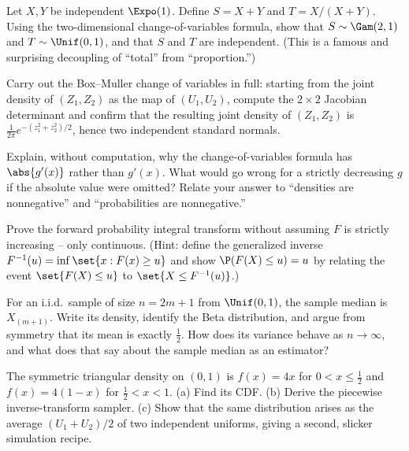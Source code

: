 \begin{exercise}
\label{ch16:ex-jacobian2}
Let $X, Y$ be independent $\Expo(1)$. Define $S = X + Y$ and $T = X/(X+Y)$. Using the
two-dimensional change-of-variables formula, show that $S \sim \Gam(2,1)$ and
$T \sim \Unif(0,1)$, and that $S$ and $T$ are independent. (This is a famous and surprising
decoupling of ``total'' from ``proportion.'')
\end{exercise}

\begin{exercise}
\label{ch16:ex-bm}
Carry out the Box--Muller change of variables in full: starting from the joint density of
$(Z_1, Z_2)$ as the map of $(U_1, U_2)$, compute the $2\times2$ Jacobian determinant and
confirm that the resulting joint density of $(Z_1,Z_2)$ is
$\tfrac{1}{2\pi}e^{-(z_1^2+z_2^2)/2}$, hence two independent standard normals.
\end{exercise}

\begin{exercise}
\label{ch16:ex-absval}
Explain, without computation, why the change-of-variables formula has $\abs{g'(x)}$ rather
than $g'(x)$. What would go wrong for a strictly decreasing $g$ if the absolute value were
omitted? Relate your answer to ``densities are nonnegative'' and ``probabilities are
nonnegative.''
\end{exercise}

\begin{exercise}
\label{ch16:ex-pit-proof}
Prove the forward probability integral transform without assuming $F$ is strictly
increasing -- only continuous. (Hint: define the generalized inverse
$F^{-1}(u) = \inf\set{x : F(x)\ge u}$ and show $\P(F(X)\le u) = u$ by relating the event
$\set{F(X)\le u}$ to $\set{X \le F^{-1}(u)}$.)
\end{exercise}

\begin{exercise}
\label{ch16:ex-median}
For an i.i.d.\ sample of size $n = 2m+1$ from $\Unif(0,1)$, the sample median is
$X_{(m+1)}$. Write its density, identify the Beta distribution, and argue from symmetry
that its mean is exactly $\tfrac12$. How does its variance behave as $n \to \infty$, and
what does that say about the sample median as an estimator?
\end{exercise}

\begin{exercise}
\label{ch16:ex-triangular}
The symmetric triangular density on $(0,1)$ is $f(x) = 4x$ for $0<x\le\tfrac12$ and
$f(x)=4(1-x)$ for $\tfrac12<x<1$. (a) Find its CDF. (b) Derive the piecewise
inverse-transform sampler. (c) Show that the same distribution arises as the average
$(U_1+U_2)/2$ of two independent uniforms, giving a second, slicker simulation recipe.
\end{exercise}
